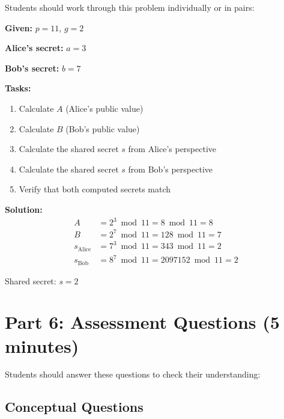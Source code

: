 \documentclass[11pt]{article}
\begin{document}
Students should work through this problem individually or in pairs:

\vspace{0.3cm}

\textbf{Given:} $p = 11$, $g = 2$

\textbf{Alice's secret:} $a = 3$

\textbf{Bob's secret:} $b = 7$

\vspace{0.3cm}

\textbf{Tasks:}
\begin{enumerate}
    \item Calculate $A$ (Alice's public value)
    \item Calculate $B$ (Bob's public value)
    \item Calculate the shared secret $s$ from Alice's perspective
    \item Calculate the shared secret $s$ from Bob's perspective
    \item Verify that both computed secrets match
\end{enumerate}

\vspace{0.3cm}

\textbf{Solution:}
\begin{align*}
A &= 2^3 \bmod 11 = 8 \bmod 11 = 8 \\
B &= 2^7 \bmod 11 = 128 \bmod 11 = 7 \\
s_{\text{Alice}} &= 7^3 \bmod 11 = 343 \bmod 11 = 2 \\
s_{\text{Bob}} &= 8^7 \bmod 11 = 2097152 \bmod 11 = 2
\end{align*}

Shared secret: $s = 2$

\section{Part 6: Assessment Questions (5 minutes)}

Students should answer these questions to check their understanding:

\subsection*{Conceptual Questions}
\end{document}
